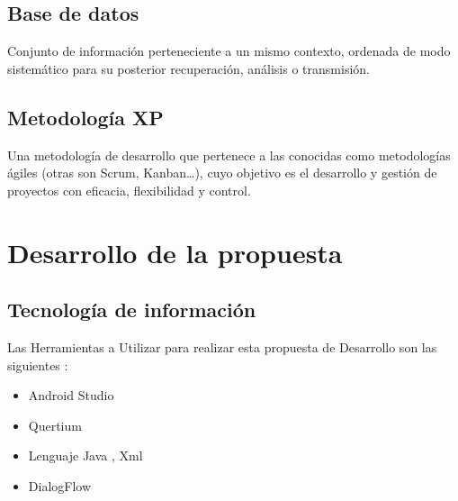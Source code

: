 \documentclass[preprint,12pt]{elsarticle}
\begin{document}
\subsection{Base de datos}
Conjunto de información perteneciente a un mismo contexto, ordenada de modo sistemático para su posterior recuperación, análisis o transmisión.
\subsection{Metodología XP}
Una metodología de desarrollo que pertenece a las conocidas como metodologías ágiles (otras son Scrum, Kanban…), cuyo objetivo es el desarrollo y gestión de proyectos con eficacia, flexibilidad y control.


\section{Desarrollo de la propuesta}
	\subsection{Tecnología de información }	
		Las Herramientas a Utilizar para realizar esta propuesta de Desarrollo son las siguientes :
		
	\begin{itemize}
    \item Android Studio 
    \item Quertium 
    \item Lenguaje Java , Xml
	\item DialogFlow
	\end{itemize}
\end{document}
